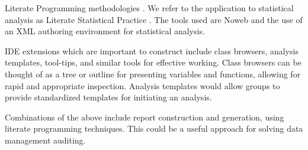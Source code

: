 \documentclass{article}
\newcommand*{\XLispStat}{\textsc{XLispStat}}
\newcommand*{\Stata}{\textsc{Stata}}
\begin{document}
Literate Programming methodologies \citep{Knuth:1992,NRamsey:1994}.
We refer to the application to statistical analysis as Literate
Statistical Practice \citep{rossini:dsc:2001}.  The tools used are
Noweb \citep{NRamsey:1994} and the use of an XML authoring environment
for statistical analysis.

IDE extensions which are important to construct include class
browsers, analysis templates, tool-tips, and similar tools for
effective working.  Class browsers can be thought of as a tree or
outline for presenting variables and functions, allowing for rapid and
appropriate inspection.   Analysis templates would allow groups to
provide standardized templates for initiating an analysis.

Combinations of the above include report construction and generation,
using literate programming techniques.  This could be a useful
approach for solving data management auditing.


\singlespace


\end{document}
